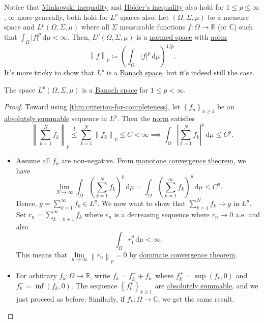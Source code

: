Notice that \hyperref[lma:Minkowski-ineq]{Minkowski inequality} and \hyperref[lma:Holder-ineq]{Hölder's inequality} also hold for \(1 \leq p \leq \infty \), or more generally, both hold for \(L^p\) spaces also. Let \((\Omega , \Sigma , \mu )\) be a measure space and \(L^p(\Omega , \Sigma , \mu )\) where all \(\Sigma \) measurable functions \(f\colon \Omega \to \mathbb{R} \) (or \(\mathbb{C} \)) such that \(\int _\Omega \left\vert f \right\vert ^p \,\mathrm{d} \mu < \infty \). Then, \(L^p(\Omega , \Sigma , \mu )\) is a \hyperref[def:normed-vector-space]{normed space} with \hyperref[def:norm]{norm}
\[
	\left\lVert f\right\rVert _p \coloneqq \left( \int _\Omega \left\vert f \right\vert ^p \,\mathrm{d} \mu  \right) ^{1 / p}.
\]
It's more tricky to show that \(L^p\) is a \hyperref[def:Banach-space]{Banach space}, but it's indeed still the case.

\begin{theorem}
	The space \(L^p(\Omega , \Sigma , \mu )\) is a \hyperref[def:Banach-space]{Banach space} for \(1 \leq p < \infty \).
\end{theorem}
\begin{proof}
	Toward using \autoref{thm:criterion-for-completeness}, let \(\left\{ f_n \right\}_{n\geq 1} \) be an \hyperref[def:absolutely-summable]{absolutely summable} sequence in \(L^p\). Then the \hyperref[def:norm]{norm} satisfies
	\[
		\left\lVert \sum_{k=1}^{N} f_k\right\rVert _p \overset{\hyperref[lma:Minkowski-ineq]{\text{!}}}{\leq} \sum_{k=1}^{N} \left\lVert f_k\right\rVert _p \leq C < \infty \implies \int _\Omega \left\vert \sum_{k=1}^{N} f_k \right\vert^p \,\mathrm{d} \mu  \leq C^p.
	\]
	\begin{itemize}
		\item Assume all \(f_k\) are non-negative. From \href{https://en.wikipedia.org/wiki/Monotone_convergence_theorem}{monotone convergence theorem}, we have
		      \[
			      \lim\limits_{N \to \infty} \int _\Omega \left( \sum_{k=1}^{N} f_k \right) ^p \,\mathrm{d} \mu = \int _\Omega \left( \sum_{k=1}^{\infty} f_k \right)^p \,\mathrm{d} \mu \leq C^p.
		      \]
		      Hence, \(g = \sum_{k=1}^{\infty} f_k\in L^p\). We now want to show that \(\sum_{k=1}^{N} f_k \to g\) in \(L^p\). Set \(r_n = \sum_{k=n+1}^{\infty} f_k\) where \(r_n\) is a decreasing sequence where \(r_n \to 0\) a.e. and also
		      \[
			      \int _\Omega r_1^p\,\mathrm{d} \mu < \infty.
		      \]
		      This means that \(\lim\limits_{n \to \infty} \left\lVert r_n\right\rVert _p = 0\) by \href{https://en.wikipedia.org/wiki/Dominated_convergence_theorem}{dominate convergence theorem}.
		\item For arbitrary \(f_k\colon \Omega \to \mathbb{R} \), write \(f_k = f^+_k + f^-_k\) where \(f^+_k = \sup (f_k, 0)\) and \(f_k^- = \inf (f_k, 0)\). The sequence \(\left\{ f_k^+ \right\}_{k\geq 1} \) are \hyperref[def:absolutely-summable]{absolutely summable}, and we just proceed as before. Similarly, if \(f_k\colon \Omega \to \mathbb{C} \), we get the same result.
	\end{itemize}
\end{proof}

